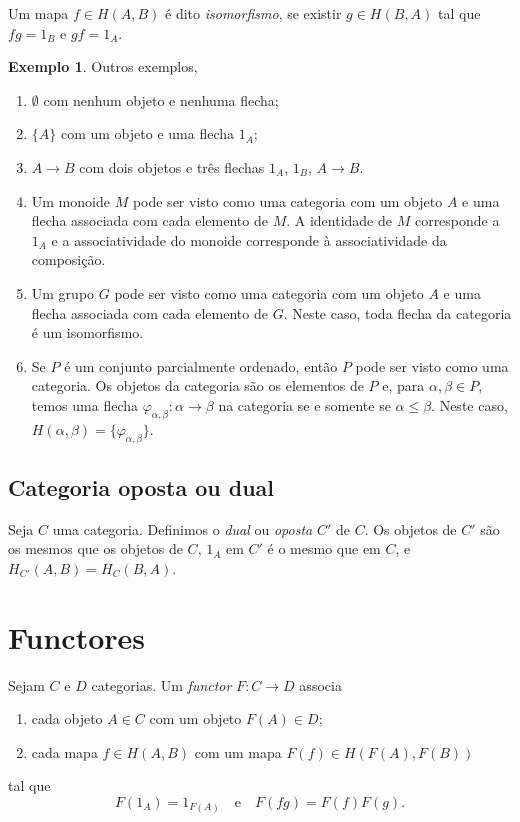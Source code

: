 \documentclass[12pt]{amsart}
\theoremstyle{definition}
\newtheorem{example}[theorem]{Exemplo}
\begin{document}
Um mapa $f\in H(A,B)$ é dito \emph{isomorfismo}, se existir $g\in H(B,A)$ tal que $fg=1_B$ e $gf=1_A$. 

\begin{example}
Outros exemplos, 
\begin{enumerate}
    \item $\emptyset$ com nenhum objeto e nenhuma flecha; 
    \item $\{A\}$ com um objeto e uma flecha $1_A$;  
\item $A\to B$ com dois objetos e três flechas $1_A$, $1_B$, $A\to B$. 
\item Um monoide $M$ pode ser visto como uma categoria com um objeto $A$ e uma flecha associada com cada elemento de $M$. A identidade de $M$ corresponde a $1_A$ e a associatividade do monoide corresponde à associatividade da composição.
\item Um grupo $G$ pode ser visto como  uma categoria com um objeto $A$ e uma flecha  associada com cada elemento de $G$. Neste caso, toda flecha da categoria é um isomorfismo.
\item Se $P$ é um conjunto parcialmente ordenado, então $P$ pode ser visto como uma categoria. Os objetos da categoria são os elementos de $P$ e, para $\alpha,\beta\in P$, 
temos uma flecha $\varphi_{\alpha,\beta}:\alpha\to\beta$ na categoria se e somente se $\alpha\leq \beta$. Neste caso, 
$H(\alpha,\beta)=\{\varphi_{\alpha,\beta}\}$. 
\end{enumerate}
\end{example}

\subsection{Categoria oposta ou dual}
Seja $C$ uma categoria. Definimos o \emph{dual} ou \emph{oposta} $C'$ de $C$. Os objetos de $C'$ são os 
mesmos que os objetos de $C$, $1_A$ em $C'$ é o mesmo que em $C$, e $H_{C'}(A,B)=H_C(B,A)$. 

\section{Functores}

Sejam $C$ e $D$ categorias. Um \emph{functor} $F:C\to D$ associa
\begin{enumerate}
\item cada objeto $A\in C$ com um objeto $F(A)\in D$;
\item cada mapa $f\in H(A,B)$ com um mapa $F(f)\in H(F(A),F(B))$
\end{enumerate}
tal que 
\[
    F(1_A)=1_{F(A)}\quad\mbox{e}\quad F(fg)=F(f)F(g).
\]
\end{document}
